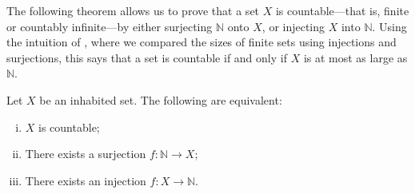 The following theorem allows us to prove that a set $X$ is countable---that is, finite or countably infinite---by either surjecting $\mathbb{N}$ onto $X$, or injecting $X$ into $\mathbb{N}$. Using the intuition of , where we compared the sizes of finite sets using injections and surjections, this says that a set is countable if and only if $X$ is at most as large as $\mathbb{N}$.

\begin{theorem} \label{thmCountableFromInjSurj}
Let $X$ be an inhabited set. The following are equivalent:
\begin{enumerate}[(i)]
\item $X$ is countable;
\item There exists a surjection $f : \mathbb{N} \to X$;
\item There exists an injection $f : X \to \mathbb{N}$.
\end{enumerate}
\end{theorem}
